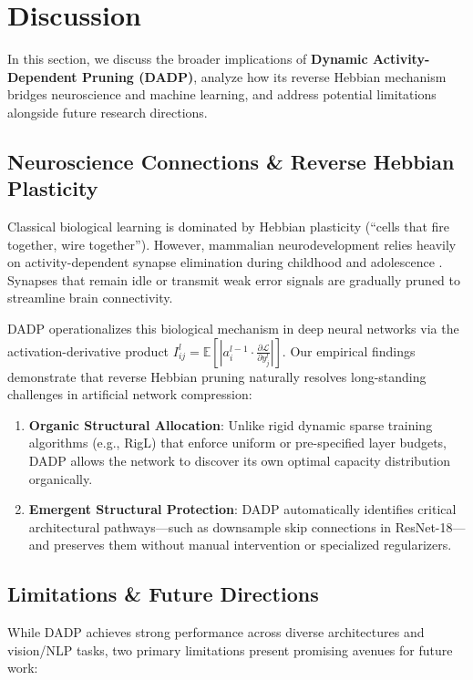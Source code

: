 \section{Discussion}

In this section, we discuss the broader implications of \textbf{Dynamic Activity-Dependent Pruning (DADP)}, analyze how its reverse Hebbian mechanism bridges neuroscience and machine learning, and address potential limitations alongside future research directions.

\subsection{Neuroscience Connections \& Reverse Hebbian Plasticity}

Classical biological learning is dominated by Hebbian plasticity (``cells that fire together, wire together''). However, mammalian neurodevelopment relies heavily on activity-dependent synapse elimination during childhood and adolescence \citep{faust2021mechanisms}. Synapses that remain idle or transmit weak error signals are gradually pruned to streamline brain connectivity. 

DADP operationalizes this biological mechanism in deep neural networks via the activation-derivative product $I_{ij}^l = \mathbb{E}\left[\left| a_i^{l-1} \cdot \frac{\partial \mathcal{L}}{\partial y_j^l} \right|\right]$. Our empirical findings demonstrate that reverse Hebbian pruning naturally resolves long-standing challenges in artificial network compression:
\begin{enumerate}
    \item \textbf{Organic Structural Allocation}: Unlike rigid dynamic sparse training algorithms (e.g., RigL) that enforce uniform or pre-specified layer budgets, DADP allows the network to discover its own optimal capacity distribution organically.
    \item \textbf{Emergent Structural Protection}: DADP automatically identifies critical architectural pathways—such as downsample skip connections in ResNet-18—and preserves them without manual intervention or specialized regularizers.
\end{enumerate}

\subsection{Limitations \& Future Directions}

While DADP achieves strong performance across diverse architectures and vision/NLP tasks, two primary limitations present promising avenues for future work:

